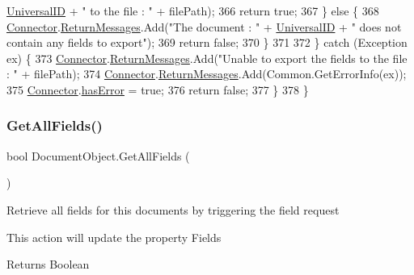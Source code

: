 \begin{DoxyCode}
      \hyperlink{class_document_object_a8b96d04632a2802e7cc5466ca5cee8cf}{UniversalID} + \textcolor{stringliteral}{" to the file : "} + filePath);
366                 \textcolor{keywordflow}{return} \textcolor{keyword}{true};
367             \} \textcolor{keywordflow}{else} \{
368                 \hyperlink{class_connector}{Connector}.\hyperlink{class_connector_a1ed422674b344524fd77998dcf6a9ba6}{ReturnMessages}.Add(\textcolor{stringliteral}{"The document : "} + 
      \hyperlink{class_document_object_a8b96d04632a2802e7cc5466ca5cee8cf}{UniversalID} + \textcolor{stringliteral}{" does not contain any fields to export"});
369                 \textcolor{keywordflow}{return} \textcolor{keyword}{false};
370             \}
371 
372         \} \textcolor{keywordflow}{catch} (Exception ex) \{
373             \hyperlink{class_connector}{Connector}.\hyperlink{class_connector_a1ed422674b344524fd77998dcf6a9ba6}{ReturnMessages}.Add(\textcolor{stringliteral}{"Unable to export the fields to the file : 
      "} + filePath);
374             \hyperlink{class_connector}{Connector}.\hyperlink{class_connector_a1ed422674b344524fd77998dcf6a9ba6}{ReturnMessages}.Add(Common.GetErrorInfo(ex));
375             \hyperlink{class_connector}{Connector}.\hyperlink{class_connector_a079bae21a5417efa53bfe8954c0f533f}{hasError} = \textcolor{keyword}{true};
376             \textcolor{keywordflow}{return} \textcolor{keyword}{false};
377         \}
378     \}
\end{DoxyCode}
\mbox{\label{class_document_object_a5e070c7c0a45ac06422ee992c841e780}} 
\subsubsection{\texorpdfstring{Get\+All\+Fields()}{GetAllFields()}}
{\footnotesize\ttfamily bool Document\+Object.\+Get\+All\+Fields (\begin{DoxyParamCaption}{ }\end{DoxyParamCaption})}



Retrieve all fields for this documents by triggering the field request 

This action will update the property \textquotesingle{}Fields\textquotesingle{} 

\begin{DoxyReturn}{Returns}
Boolean
\end{DoxyReturn}



